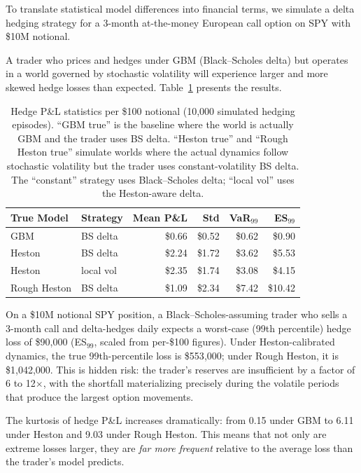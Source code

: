 \documentclass[11pt,a4paper]{article}
\begin{document}
To translate statistical model differences into financial terms, we simulate a delta hedging strategy for a 3-month at-the-money European call option on SPY with \$10M notional.

A trader who prices and hedges under GBM (Black--Scholes delta) but operates in a world governed by stochastic volatility will experience larger and more skewed hedge losses than expected.
Table~\ref{tab:hedging} presents the results.

\begin{table}[H]
\centering
\caption{Hedge P\&L statistics per \$100 notional (10{,}000 simulated hedging episodes). ``GBM true'' is the baseline where the world is actually GBM and the trader uses BS delta. ``Heston true'' and ``Rough Heston true'' simulate worlds where the actual dynamics follow stochastic volatility but the trader uses constant-volatility BS delta. The ``constant'' strategy uses Black--Scholes delta; ``local vol'' uses the Heston-aware delta.}
\label{tab:hedging}
\small
\begin{tabular}{@{}llrrrr@{}}
\toprule
\textbf{True Model} & \textbf{Strategy} & \textbf{Mean P\&L} & \textbf{Std} & \textbf{VaR$_{99}$} & \textbf{ES$_{99}$} \\
\midrule
GBM          & BS delta    & \$0.66  & \$0.52  & \$0.62  & \$0.90  \\
Heston       & BS delta    & \$2.24  & \$1.72  & \$3.62  & \$5.53  \\
Heston       & local vol   & \$2.35  & \$1.74  & \$3.08  & \$4.15  \\
Rough Heston & BS delta    & \$1.09  & \$2.34  & \$7.42  & \$10.42 \\
\bottomrule
\end{tabular}
\end{table}

On a \$10M notional SPY position, a Black--Scholes-assuming trader who sells a 3-month call and delta-hedges daily expects a worst-case (99th percentile) hedge loss of \$90{,}000 (ES$_{99}$, scaled from per-\$100 figures).
Under Heston-calibrated dynamics, the true 99th-percentile loss is \$553{,}000; under Rough Heston, it is \$1{,}042{,}000.
This is hidden risk: the trader's reserves are insufficient by a factor of 6 to 12$\times$, with the shortfall materializing precisely during the volatile periods that produce the largest option movements.

The kurtosis of hedge P\&L increases dramatically: from 0.15 under GBM to 6.11 under Heston and 9.03 under Rough Heston.
This means that not only are extreme losses larger, they are \emph{far more frequent} relative to the average loss than the trader's model predicts.
\end{document}
